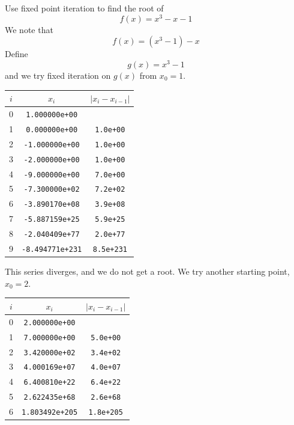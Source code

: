 \begin{example}
    Use fixed point iteration to find the root of \[
        f(x) = x^3 - x - 1
    \]
    We note that \[
        f(x) = (x^3 - 1) - x
    \] Define \[
        g(x) = x^3 - 1
    \] and we try fixed iteration on \( g(x) \) from \( x_0 = 1 \).

    \begin{table}[H]
        \centering
        \begin{tabular}{c|c|c}
            \( i \) & \( x_i \)               & \( | x_i - x_{i-1} | \)
            \\ \hline \hline
            0       & \texttt{1.000000e+00}   &
            \\
            1       & \texttt{0.000000e+00}   & \texttt{1.0e+00}
            \\
            2       & \texttt{-1.000000e+00}  & \texttt{1.0e+00}
            \\
            3       & \texttt{-2.000000e+00}  & \texttt{1.0e+00}
            \\
            4       & \texttt{-9.000000e+00}  & \texttt{7.0e+00}
            \\
            5       & \texttt{-7.300000e+02}  & \texttt{7.2e+02}
            \\
            6       & \texttt{-3.890170e+08}  & \texttt{3.9e+08}
            \\
            7       & \texttt{-5.887159e+25}  & \texttt{5.9e+25}
            \\
            8       & \texttt{-2.040409e+77}  & \texttt{2.0e+77}
            \\
            9       & \texttt{-8.494771e+231} & \texttt{8.5e+231}
        \end{tabular}
    \end{table}
    This series diverges, and we do not get a root. We try another starting point, \( x_0 = 2 \).
    \begin{table}[H]
        \centering
        \begin{tabular}{c|c|c}
            \( i \) & \( x_i \)              & \( | x_i - x_{i-1} | \)
            \\ \hline \hline
            0       & \texttt{2.000000e+00}  &
            \\
            1       & \texttt{7.000000e+00}  & \texttt{5.0e+00}
            \\
            2       & \texttt{3.420000e+02}  & \texttt{3.4e+02}
            \\
            3       & \texttt{4.000169e+07}  & \texttt{4.0e+07}
            \\
            4       & \texttt{6.400810e+22}  & \texttt{6.4e+22}
            \\
            5       & \texttt{2.622435e+68}  & \texttt{2.6e+68}
            \\
            6       & \texttt{1.803492e+205} & \texttt{1.8e+205}
        \end{tabular}
    \end{table}


\end{example}
